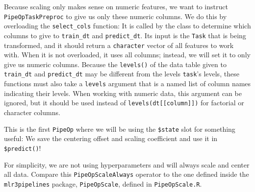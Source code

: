 \documentclass[]{article}
\begin{document}
Because scaling only makes sense on numeric features, we want to instruct \texttt{PipeOpTaskPreproc} to give us only these numeric columns.
We do this by overloading the \texttt{select\_cols} function: It is called by the class to determine which columns to give to \texttt{train\_dt} and \texttt{predict\_dt}.
Its input is the \texttt{Task} that is being transformed, and it should return a \texttt{character} vector of all features to work with.
When it is not overloaded, it uses all columns; instead, we will set it to only give us numeric columns.
Because the \texttt{levels()} of the data table given to \texttt{train\_dt} and \texttt{predict\_dt} may be different from the levels \texttt{task}'s levels, these functions must also take a \texttt{levels} argument that is a named list of column names indicating their levels.
When working with numeric data, this argument can be ignored, but it should be used instead of \texttt{levels(dt{[}{[}column{]}{]})} for factorial or character columns.

This is the first \texttt{PipeOp} where we will be using the \texttt{\$state} slot for something useful: We save the centering offset and scaling coefficient and use it in \texttt{\$predict()}!

For simplicity, we are not using hyperparameters and will always scale and center all data.
Compare this \texttt{PipeOpScaleAlways} operator to the one defined inside the \texttt{mlr3pipelines} package, \texttt{PipeOpScale}, defined in \texttt{PipeOpScale.R}.
\end{document}
